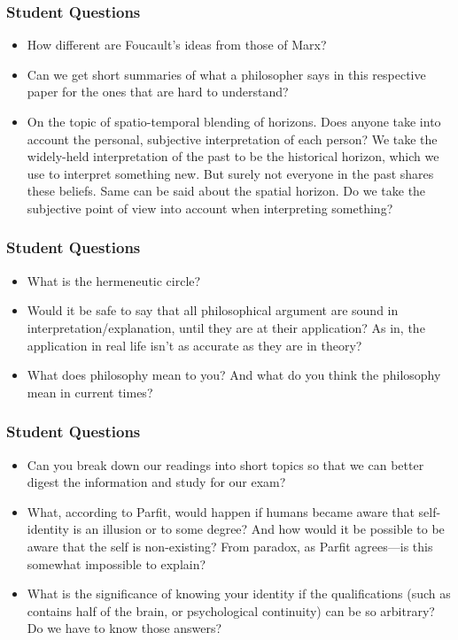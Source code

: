 \documentclass[xcolor=dvipsnames]{beamer}
\begin{document}
\begin{frame}
  \frametitle{Student Questions}
  \begin{itemize}
  \item How different are Foucault's ideas from those of Marx?
  \item Can we get short summaries of what a philosopher says in this
    respective paper for the ones that are hard to understand?
  \item On the topic of spatio-temporal blending of horizons. Does
    anyone take into account the personal, subjective interpretation
    of each person? We take the widely-held interpretation of the past
    to be the historical horizon, which we use to interpret something
    new. But surely not everyone in the past shares these beliefs.
    Same can be said about the spatial horizon. Do we take the
    subjective point of view into account when interpreting something?
  \end{itemize}
\end{frame}

\begin{frame}
  \frametitle{Student Questions}
  \begin{itemize}
  \item What is the hermeneutic circle?
  \item Would it be safe to say that all philosophical argument are
    sound in interpretation/explanation, until they are at their
    application? As in, the application in real life isn't as accurate
    as they are in theory?
  \item What does philosophy mean to you? And what do you think the
    philosophy mean in current times?
  \end{itemize}
\end{frame}

\begin{frame}
  \frametitle{Student Questions}
  \begin{itemize}
  \item Can you break down our readings into short topics so that we
    can better digest the information and study for our exam?
  \item What, according to Parfit, would happen if humans became aware
    that self-identity is an illusion or to some degree? And how would
    it be possible to be aware that the self is non-existing? From
    paradox, as Parfit agrees---is this somewhat impossible to
    explain?
  \item What is the significance of knowing your identity if the
    qualifications (such as contains half of the brain, or
    psychological continuity) can be so arbitrary? Do we have to know
    those answers?
  \end{itemize}
\end{frame}
\end{document}
